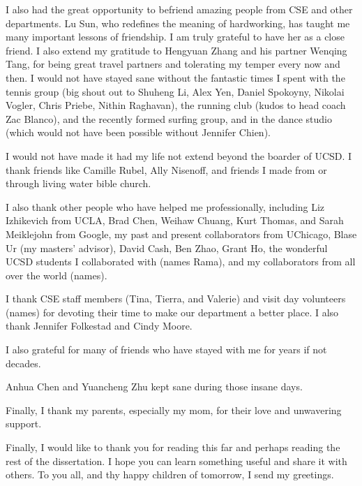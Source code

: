 \documentclass[12pt]{ucsddissertation}
\begin{document}
\begin{acknowledgements}
I also had the great opportunity to befriend amazing people from CSE and other departments. Lu Sun, who redefines the meaning of hardworking, has taught me many important lessons of friendship. I am truly grateful to have her as a close friend. I also extend my gratitude to Hengyuan Zhang and his partner Wenqing Tang, for being great travel partners and tolerating my temper every now and then. I would not have stayed sane without the fantastic times I spent with the tennis group (big shout out to Shuheng Li, Alex Yen, Daniel Spokoyny, Nikolai Vogler, Chris Priebe, Nithin Raghavan), the running club (kudos to head coach Zac Blanco), and the recently formed surfing group, and in the dance studio (which would not have been possible without Jennifer Chien).

I would not have made it had my life not extend beyond the boarder of UCSD. I thank friends like Camille Rubel, Ally Nisenoff, and friends I made from or through living water bible church.

I also thank other people who have helped me professionally, including Liz Izhikevich from UCLA, Brad Chen, Weihaw Chuang, Kurt Thomas, and Sarah Meiklejohn from Google, my past and present collaborators from UChicago, Blase Ur (my masters' advisor), David Cash, Ben Zhao, Grant Ho, the wonderful UCSD students I collaborated with (names Rama), and my collaborators from all over the world (names).

I thank CSE staff members (Tina, Tierra, and Valerie) and visit day volunteers (names) for devoting their time to make our department a better place. I also thank Jennifer Folkestad and Cindy Moore.

I also grateful for many of friends who have stayed with me for years if not decades.

Anhua Chen and Yuancheng Zhu kept sane during those insane days.

Finally, I thank my parents, especially my mom, for their love and unwavering support.

Finally, I would like to thank you for reading this far and perhaps reading the rest of the dissertation. I hope you can learn something useful and share it with others. To you all, and thy happy children of tomorrow, I send my greetings.


\end{acknowledgements}
\end{document}
